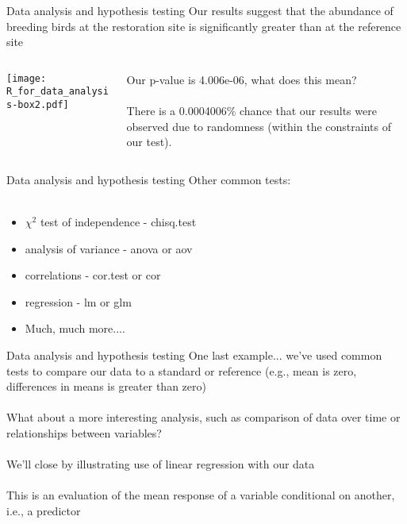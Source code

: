 \documentclass[xcolor=svgnames]{beamer}
\begin{document}
\begin{frame}{Data analysis and hypothesis testing}
Our results suggest that the abundance of breeding birds at the restoration site is significantly greater than at the reference site
\pause
\vspace{0.5in}
\begin{columns}
\begin{column}{0.5\textwidth}
\centerline{\texttt{[image: R\_for\_data\_analysis-box2.pdf]}}
\end{column}
\begin{column}{0.5\textwidth}
Our p-value is 4.006e-06, what does this mean?\\~\\ 
\pause
There is a 0.0004006\% chance that our results were observed due to randomness (within the constraints of our test).
\end{column}
\end{columns}
\end{frame}

\begin{frame}[t]{Data analysis and hypothesis testing}
Other common tests:\\~\\
\begin{itemize}
\itemsep20pt
\item $\chi^2$ test of independence - chisq.test
\item analysis of variance - anova or aov
\item correlations - cor.test or cor
\item regression - lm or glm 
\item Much, much more....
\end{itemize}
\end{frame}

\begin{frame}{Data analysis and hypothesis testing}
One last example... we've used common tests to compare our data to a standard or reference (e.g., mean is zero, differences in means is greater than zero)\\~\\
What about a more interesting analysis, such as comparison of data over time or relationships between variables?\\~\\
We'll close by illustrating use of linear regression with our data\\~\\
This is an evaluation of the mean response of a variable conditional on another, i.e., a predictor
\end{frame}
\end{document}
